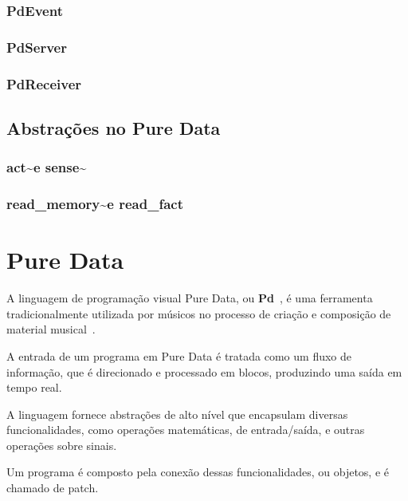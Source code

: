 \documentclass[a4paper, 11pt, twoside]{article}
\begin{document}
\begin{multicols}{2}
\subsubsection{PdEvent}

\subsubsection{PdServer}

\subsubsection{PdReceiver}

\subsection{Abstrações no Pure Data}

\subsubsection{act\textasciitilde e sense\textasciitilde}

\subsubsection{read\_memory\textasciitilde e read\_fact}

\section{Pure Data}

A linguagem de programação visual Pure Data, ou \textbf{Pd}~\cite{puckette97}, 
é uma ferramenta tradicionalmente utilizada por músicos no processo de criação
e composição de material musical~\cite{leandro11}. 

A entrada de um programa em Pure Data é tratada como
um fluxo de informação, que é direcionado e processado
em blocos, produzindo uma saída em tempo real.

A linguagem fornece abstrações de alto nível que encapsulam
diversas funcionalidades, como operações matemáticas,
de entrada/saída, e outras operações sobre sinais.

Um programa é composto pela conexão dessas
funcionalidades, ou objetos, e é chamado de patch.


\end{multicols}
\end{document}
